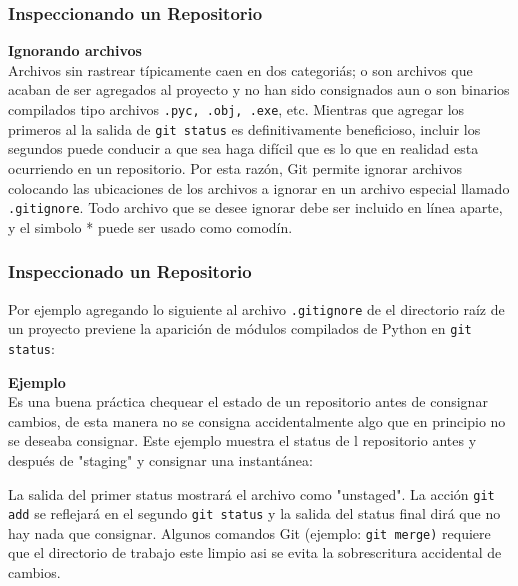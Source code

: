 \documentclass[8pt]{beamer}
\begin{document}
\begin{frame}
\frametitle{Inspeccionando un Repositorio}

\textbf{Ignorando archivos}\\
\medskip
Archivos sin rastrear t\'ipicamente caen en dos categori\'as; o son archivos que acaban de ser agregados al proyecto y no han sido consignados aun o son binarios compilados tipo archivos \texttt{.pyc, .obj, .exe}, etc. Mientras que agregar los primeros al la salida de \texttt{git status} es definitivamente beneficioso, incluir los segundos puede conducir a que sea haga dif\'icil que es lo que en realidad esta ocurriendo en un repositorio. Por esta raz\'on, Git permite ignorar archivos colocando las ubicaciones de los archivos a ignorar en un archivo especial llamado \texttt{.gitignore}. Todo archivo que se desee ignorar debe ser incluido en l\'inea aparte, y el simbolo * puede ser usado como comod\'in.
\end{frame}
\begin{frame}
\frametitle{Inspeccionado un Repositorio}
Por ejemplo agregando lo siguiente al archivo \texttt{.gitignore} de el directorio ra\'iz de un proyecto previene la aparici\'on de m\'odulos compilados de Python en \texttt{git status}:

\textbf{Ejemplo}\\
\medskip
Es una buena pr\'actica chequear el estado de un repositorio antes de consignar cambios, de esta manera no se consigna accidentalmente algo que en principio no se deseaba consignar. Este ejemplo muestra el status de l repositorio antes y despu\'es de "staging" y consignar una instant\'anea:

La salida del primer status mostrar\'a el archivo como "unstaged". La acci\'on \texttt{git add} se reflejar\'a en el segundo \texttt{git status} y la salida del status final dir\'a que no hay nada que consignar. Algunos comandos Git (ejemplo: \texttt{git merge)} requiere que el directorio de trabajo este limpio asi se evita la sobrescritura accidental de cambios.
\end{frame}

\end{document}
